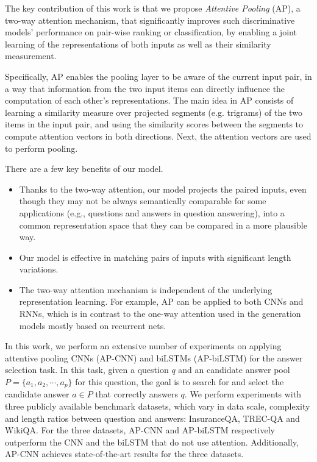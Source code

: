 \documentclass{article}
\begin{document}
The key contribution of this work is that we propose \emph{Attentive Pooling} (AP),
a two-way attention mechanism, that significantly improves such discriminative models' performance on 
pair-wise ranking or classification, by enabling a joint learning of the representations of both inputs 
as well as their similarity measurement.

Specifically, AP enables the pooling layer to be aware of the current input pair, 
in a way that information from the two input items can directly influence the computation of each other's representations.
The main idea in AP consists of learning a similarity measure over projected segments (e.g. trigrams) of the two items in the input pair,
and using the similarity scores between the segments to compute attention vectors in both directions. 
Next,
the attention vectors are used to perform pooling.


There are a few key benefits of our model.
\begin{itemize}
\item Thanks to the two-way attention, our model projects the paired inputs, even though they may not be always semantically comparable for some applications (e.g., questions and answers in question answering), into a common representation space that they can be compared in a more plausible way.
\item Our model is effective in matching pairs of inputs with significant length variations.
\item The two-way attention mechanism is independent of the underlying representation learning. For example, AP can be applied to both CNNs and RNNs, which is in contrast to the one-way attention used in the generation models mostly based on recurrent nets.
\end{itemize}














In this work,
we perform an extensive number of experiments on applying attentive pooling CNNs (AP-CNN) and biLSTMs (AP-biLSTM) for the answer selection task.
In this task,
given a question $q$ and an candidate answer pool $P=\{a_1, a_2, \cdots , a_p\}$ for this question, 
the goal is to search for and select the candidate answer $a \in P$ that correctly answers $q$.
We perform experiments with three publicly available benchmark datasets, which vary in data scale, complexity and length ratios between question and answers: InsuranceQA, TREC-QA and WikiQA.
For the three datasets,
AP-CNN and AP-biLSTM respectively outperform the CNN and the biLSTM that do not use attention.
Additionally,
AP-CNN achieves state-of-the-art results for the three datasets.
\end{document}
